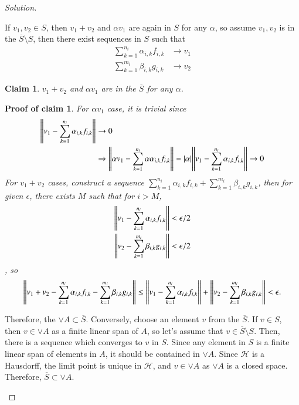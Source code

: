\documentclass[a4paper, 12pt]{article}
\theoremstyle{Mydefinition}
\theoremstyle{Mytheorem}
\newtheorem{claim}{Claim}
\newtheorem{claimproof}{Proof of claim}[claim]
\begin{document}
\begin{proof}[Solution]
\begin{enumerate}
If $v_1,v_2\in S$, then $v_1+v_2$ and $\alpha v_1$ are again in $S$ for any $\alpha$, so assume $v_1,v_2$ is in the $\overline{S}\setminus S$, then there exist sequences in $S$ such that
\begin{equation}
    \begin{split}
        \sum_{k=1}^{n_{i}} \alpha_{i, k} f_{i, k}&\rightarrow v_1 \\
        \sum_{k=1}^{m_{i}} \beta_{i, k} g_{i, k}&\rightarrow v_2
    \end{split}
\end{equation}
\begin{claim}
$v_1+v_2$ and $\alpha v_1$ are in the $\overline{S}$ for any $\alpha$.
\end{claim}
\begin{claimproof}
For $\alpha v_1$ case, it is trivial since 
\begin{equation}
\begin{split}
        \norm{v_1-\sum_{k=1}^{n_{i}} \alpha_{i, k} f_{i, k}}&\rightarrow 0 \\
        &\Rightarrow \norm{\alpha v_1-\sum_{k=1}^{n_{i}} \alpha \alpha_{i, k} f_{i, k}} = \abs{\alpha}\norm{v_1-\sum_{k=1}^{n_{i}} \alpha_{i, k} f_{i, k}}\rightarrow 0
\end{split}
\end{equation}
For $v_1+v_2$ cases, construct a sequence $\sum_{k=1}^{n_{i}} \alpha_{i, k} f_{i, k} + \sum_{k=1}^{m_{i}} \beta_{i, k} g_{i, k}$, then for given $\epsilon$, there exists $M$ such that for $i>M$,
\begin{equation}
    \begin{split}
        \norm{v_1 - \sum_{k=1}^{n_{i}} \alpha_{i, k} f_{i, k}}&<\epsilon/2 \\
        \norm{v_2-\sum_{k=1}^{m_{i}} \beta_{i, k} g_{i, k}}&<\epsilon/2
    \end{split}
\end{equation}
, so
\begin{equation}
        \norm{v_1+v_2-\sum_{k=1}^{n_{i}} \alpha_{i, k} f_{i, k}-\sum_{k=1}^{m_{i}} \beta_{i, k} g_{i, k}}\leq   \norm{v_1 - \sum_{k=1}^{n_{i}} \alpha_{i, k} f_{i, k}} +  \norm{v_2-\sum_{k=1}^{m_{i}} \beta_{i, k} g_{i, k}}<\epsilon.
\end{equation}
\end{claimproof}
Therefore, the $\vee A \subset \overline{S}$.
Conversely, choose an element $v$ from the $\overline{S}$. If $v\in S$, then $v\in \vee A$ as a finite linear span of $A$, so let's assume that $v\in \overline{S}\setminus S$. Then, there is a sequence which converges to $v$ in $S$. Since any element in $S$ is a finite linear span of elements in $A$, it should be contained in $\vee A$. Since $\mathcal{H}$ is a Hausdorff, the limit point is unique in $\mathcal{H}$, and $v\in \vee A$ as $\vee A$ is a closed space. Therefore, $\overline{S} \subset \vee A$. 


\end{enumerate}
\end{proof}
\end{document}
